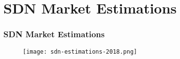 \section{SDN Market Estimations}

\begin{frame}
\frametitle{SDN Market Estimations}

\begin{center}
  \begin{figure}
    \texttt{[image: sdn-estimations-2018.png]}
  \end{figure}
\end{center}

\end{frame}
